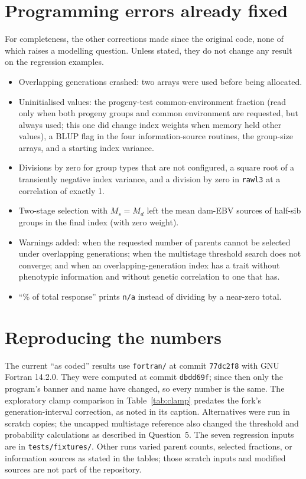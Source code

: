 \documentclass[11pt]{article}
\newcommand{\src}[1]{\texttt{#1}}
\begin{document}
\section{Programming errors already fixed}\label{app:fixed}
For completeness, the other corrections made since the original code, none of which raises a modelling question. Unless stated, they do not change any result on the regression examples.
\begin{itemize}
\item Overlapping generations crashed: two arrays were used before being allocated.
\item Uninitialised values: the progeny-test common-environment fraction (read only when both progeny groups and common environment are requested, but always used; this one did change index weights when memory held other values), a BLUP flag in the four information-source routines, the group-size arrays, and a starting index variance.
\item Divisions by zero for group types that are not configured, a square root of a transiently negative index variance, and a division by zero in \src{rawl3} at a correlation of exactly 1.
\item Two-stage selection with $M_s=M_d$ left the mean dam-EBV sources of half-sib groups in the final index (with zero weight).
\item Warnings added: when the requested number of parents cannot be selected under overlapping generations; when the multistage threshold search does not converge; and when an overlapping-generation index has a trait without phenotypic information and without genetic correlation to one that has.
\item ``\% of total response'' prints \texttt{n/a} instead of dividing by a near-zero total.
\end{itemize}

\section{Reproducing the numbers}
The current ``as coded'' results use \src{fortran/} at commit \src{77dc2f8} with GNU Fortran 14.2.0. They were computed at commit \src{dbdd69f}; since then only the program's banner and name have changed, so every number is the same. The exploratory clamp comparison in Table~\ref{tab:clamp} predates the fork's generation-interval correction, as noted in its caption. Alternatives were run in scratch copies; the uncapped multistage reference also changed the threshold and probability calculations as described in Question~5. The seven regression inputs are in \src{tests/fixtures/}. Other runs varied parent counts, selected fractions, or information sources as stated in the tables; those scratch inputs and modified sources are not part of the repository.
\end{document}
